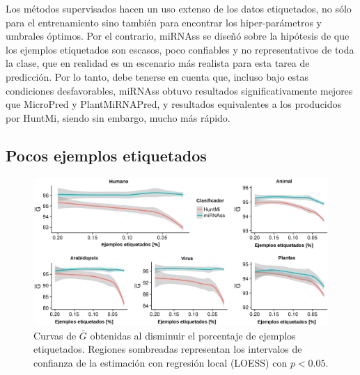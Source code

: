 Los métodos supervisados hacen un uso extenso de los datos etiquetados, no sólo para el entrenamiento sino también para encontrar los hiper-parámetros
y umbrales óptimos. Por el contrario, miRNAss se diseñó sobre la hipótesis de que los ejemplos etiquetados son escasos, poco confiables y no
representativos de toda la clase, que en realidad es un escenario más realista para esta tarea de predicción. Por lo tanto, debe tenerse en cuenta que,
incluso bajo estas condiciones desfavorables, miRNAss obtuvo resultados significativamente mejores que MicroPred y PlantMiRNAPred, y resultados equivalentes a
los producidos por HuntMi, siendo sin embargo, mucho más rápido.

\subsection{Pocos ejemplos etiquetados}

\begin{figure}[t]
	\centering
	\includegraphics[width=\linewidth]{fig/few_labeled-huntmi.eps}
	\caption[$\bar{G}$ con pocos ejemplos de entrenamiento]{Curvas de $\bar{G}$ obtenidas al disminuir el porcentaje de ejemplos etiquetados. Regiones
		sombreadas representan los intervalos de confianza de la estimación con regresión local (LOESS) con $p < 0.05$.}
	\label{fig:fewSamples:huntmi}
\end{figure}

